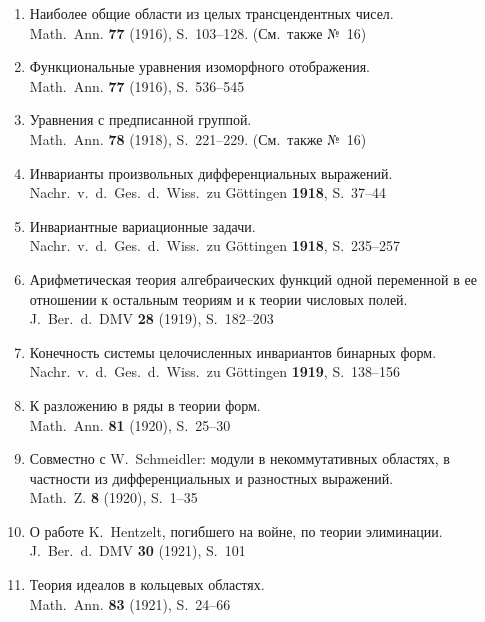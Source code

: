 \documentclass[11pt]{article}
\newcommand{\foreign}[1]{#1}
\begin{document}
\begin{enumerate}[label={\small\arabic*.},leftmargin=2em,itemsep=0.3em]
\item Наиболее общие области из целых трансцендентных чисел.\\
\foreign{Math.\ Ann.} \textbf{77} (1916), S.~103--128. (См.\ также №~16)

\item Функциональные уравнения изоморфного отображения.\\
\foreign{Math.\ Ann.} \textbf{77} (1916), S.~536--545

\item Уравнения с предписанной группой.\\
\foreign{Math.\ Ann.} \textbf{78} (1918), S.~221--229. (См.\ также №~16)

\item Инварианты произвольных дифференциальных выражений.\\
\foreign{Nachr.\ v.\ d.\ Ges.\ d.\ Wiss.\ zu Göttingen} \textbf{1918}, S.~37--44

\item Инвариантные вариационные задачи.\\
\foreign{Nachr.\ v.\ d.\ Ges.\ d.\ Wiss.\ zu Göttingen} \textbf{1918}, S.~235--257

\item Арифметическая теория алгебраических функций одной переменной в ее отношении к остальным теориям и к теории числовых полей.\\
\foreign{J.\ Ber.\ d.\ DMV} \textbf{28} (1919), S.~182--203

\item Конечность системы целочисленных инвариантов бинарных форм.\\
\foreign{Nachr.\ v.\ d.\ Ges.\ d.\ Wiss.\ zu Göttingen} \textbf{1919}, S.~138--156

\item К разложению в ряды в теории форм.\\
\foreign{Math.\ Ann.} \textbf{81} (1920), S.~25--30

\item Совместно с W.\ Schmeidler: модули в некоммутативных областях, в частности из дифференциальных и разностных выражений.\\
\foreign{Math.\ Z.} \textbf{8} (1920), S.~1--35

\item О работе K.\ Hentzelt, погибшего на войне, по теории элиминации.\\
\foreign{J.\ Ber.\ d.\ DMV} \textbf{30} (1921), S.~101

\item Теория идеалов в кольцевых областях.\\
\foreign{Math.\ Ann.} \textbf{83} (1921), S.~24--66


\end{enumerate}
\end{document}
